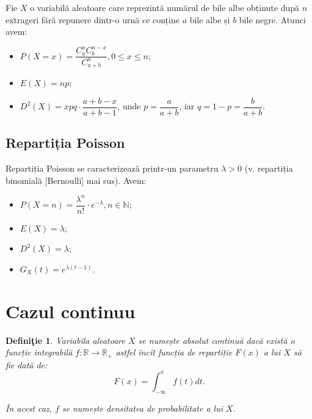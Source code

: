 \documentclass[12pt,a4paper]{article}
\newcommand\NN{\mathbb{N}}
\newcommand\RR{\mathbb{R}}
\theoremstyle{dotless}
\theoremstyle{dotlessdr}
\newtheorem{definition}{Defini\c{t}ie}
\begin{document}
\indent\indent Fie $ X $ o variabilă aleatoare care reprezintă numărul de bile albe
obținute după $ n $ extrageri fără repunere dintr-o urnă ce conține $ a $ bile albe
și $ b $ bile negre. Atunci avem:
\begin{itemize}
\item $ P(X = x) = \dfrac{C_a^x C_b^{n-x}}{C_{a + b}^n}, 0 \leq x \leq n $;
\item $ E(X) = np $;
\item $ D^2(X) = xpq \cdot \dfrac{a + b - x}{a + b - 1} $, unde $ p = \dfrac{a}{a+b}$,
  iar $ q = 1 - p = \dfrac{b}{a + b} $.
\end{itemize}


\subsection*{Repartiția Poisson}

\indent\indent Repartiția Poisson se caracterizează printr-un parametru $ \lambda > 0 $
(v. repartiția binomială [Bernoulli] mai sus). Avem:
\begin{itemize}
\item $ P(X = n) = \dfrac{\lambda^n}{n!} \cdot e^{-\lambda}, n \in \NN $;
\item $ E(X) = \lambda $;
\item $ D^2(X) = \lambda $;
\item $ G_X(t) = e^{\lambda(t - 1)} $.
\end{itemize}


\section*{Cazul continuu}


\begin{definition}\label{def:va-cont}
  Variabila aleatoare $ X $ se numește \emph{absolut continuă} dacă
  există o funcție integrabilă $ f : \RR \to \RR_+ $ astfel încît funcția
  de repartiție $ F(x) $ a lui $ X $ să fie dată de:
  \[
    F(x) = \int_{-\infty}^x f(t) dt.
  \]

  În acest caz, $ f $ se numește \emph{densitatea de probabilitate} a lui $ X $.
\end{definition}
\end{document}
